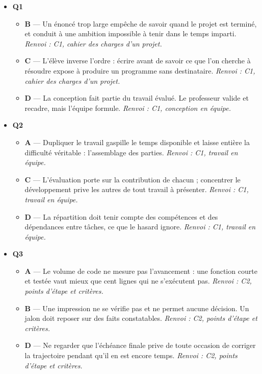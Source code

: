 \begin{itemize}
  \item \textbf{Q1}
  \begin{itemize}
    \item \textbf{B} — Un énoncé trop large empêche de savoir quand le projet est terminé, et conduit à une ambition impossible à tenir dans le temps imparti. \emph{Renvoi : C1, cahier des charges d'un projet.}
    \item \textbf{C} — L'élève inverse l'ordre : écrire avant de savoir ce que l'on cherche à résoudre expose à produire un programme sans destinataire. \emph{Renvoi : C1, cahier des charges d'un projet.}
    \item \textbf{D} — La conception fait partie du travail évalué. Le professeur valide et recadre, mais l'équipe formule. \emph{Renvoi : C1, conception en équipe.}
  \end{itemize}
  \item \textbf{Q2}
  \begin{itemize}
    \item \textbf{A} — Dupliquer le travail gaspille le temps disponible et laisse entière la difficulté véritable : l'assemblage des parties. \emph{Renvoi : C1, travail en équipe.}
    \item \textbf{C} — L'évaluation porte sur la contribution de chacun ; concentrer le développement prive les autres de tout travail à présenter. \emph{Renvoi : C1, travail en équipe.}
    \item \textbf{D} — La répartition doit tenir compte des compétences et des dépendances entre tâches, ce que le hasard ignore. \emph{Renvoi : C1, travail en équipe.}
  \end{itemize}
  \item \textbf{Q3}
  \begin{itemize}
    \item \textbf{A} — Le volume de code ne mesure pas l'avancement : une fonction courte et testée vaut mieux que cent lignes qui ne s'exécutent pas. \emph{Renvoi : C2, points d'étape et critères.}
    \item \textbf{B} — Une impression ne se vérifie pas et ne permet aucune décision. Un jalon doit reposer sur des faits constatables. \emph{Renvoi : C2, points d'étape et critères.}
    \item \textbf{D} — Ne regarder que l'échéance finale prive de toute occasion de corriger la trajectoire pendant qu'il en est encore temps. \emph{Renvoi : C2, points d'étape et critères.}
  \end{itemize}

\end{itemize}
